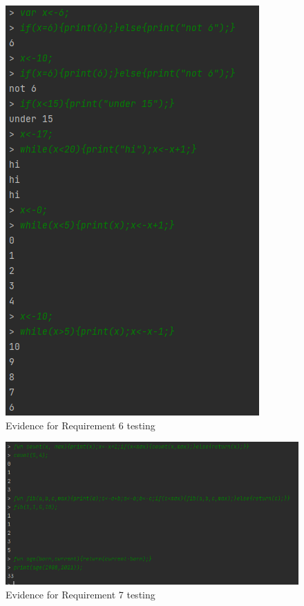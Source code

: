 \documentclass[a4paper, oneside, 11pt]{report}
\begin{document}
\begin{figure}
\includegraphics{Requirement 6.PNG}
\caption{Evidence for Requirement 6 testing}
\end{figure}

\begin{figure}
\includegraphics[width=13cm]{Requirement 7.PNG}
\caption{Evidence for Requirement 7 testing}
\end{figure}
\end{document}
